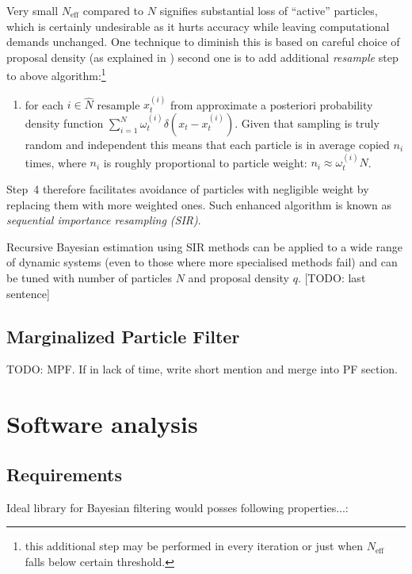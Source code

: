\documentclass[a4paper,12pt,oneside]{report}
\newcommand{\pdf}{probability density function}
\begin{document}
Very small \(N_{\text{eff}}\) compared to \(N\) signifies substantial loss of ``active'' particles,
which is certainly undesirable as it hurts accuracy while leaving computational demands unchanged.
One technique to diminish this is based on careful choice of proposal density (as explained in
\cite{AruMasGor:02}) second one is to add additional \emph{resample} step to above
algorithm:\footnote{this additional step may be performed in every iteration or just when
\(N_{\text{eff}}\) falls below certain threshold.}
\begin{enumerate}[resume] %
	\item for each \(i \in \widehat{N}\) resample \(x_t^{(i)}\) from approximate a posteriori {\pdf}
		\(\sum_{i=1}^N \omega_t^{(i)} \delta(x_t - x_t^{(i)})\). Given that sampling is truly random
		and independent this means that each particle is in average copied \(n_i\) times, where \(n_i\)
		is roughly proportional to particle weight: \(n_i \approx \omega_t^{(i)} N\).
\end{enumerate}

Step~4 therefore facilitates avoidance of particles with negligible weight by replacing them with more weighted
ones. Such enhanced algorithm is known as \emph{sequential importance resampling (SIR)}.

Recursive Bayesian estimation using SIR methods can be applied to a wide range of dynamic systems
(even to those where more specialised methods fail) and can be tuned with number of particles \(N\) and
proposal density \(q\). [TODO: last sentence]

\section{Marginalized Particle Filter}

TODO: MPF. If in lack of time, write short mention and merge into PF section. %

\chapter{Software analysis}

\section{Requirements}

Ideal library for Bayesian filtering would posses following properties...:
\end{document}
